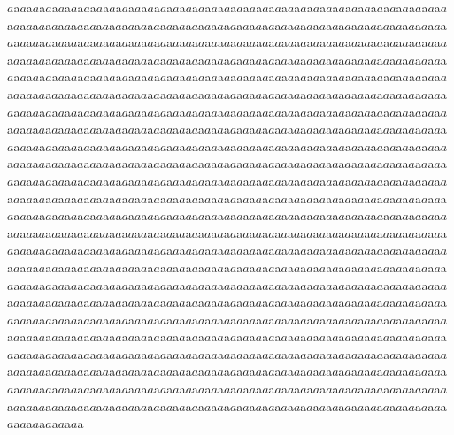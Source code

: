 \documentclass{article}
\begin{document}
$a$a$a$a$a$a$a$a$a$a$a$a$a$a$a$a$a$a$a$a$a$a$a$a$a$a$a$a$a$a$a$a$a$a$a$a$a$a$a$a$a$a$a$a$a$a$a$a$a$a$a$a$a$a$a$a$a$a$a$a$a$a$a$a$a$a$a$a$a$a$a$a$a$a$a$a$a$a$a$a$a$a$a$a$a$a$a$a$a$a$a$a$a$a$a$a$a$a$a$a$a$a$a$a$a$a$a$a$a$a$a$a$a$a$a$a$a$a$a$a$a$a$a$a$a$a$a$a$a$a$a$a$a$a$a$a$a$a$a$a$a$a$a$a$a$a$a$a$a$a$a$a$a$a$a$a$a$a$a$a$a$a$a$a$a$a$a$a$a$a$a$a$a$a$a$a$a$a$a$a$a$a$a$a$a$a$a$a$a$a$a$a$a$a$a$a$a$a$a$a$a$a$a$a$a$a$a$a$a$a$a$a$a$a$a$a$a$a$a$a$a$a$a$a$a$a$a$a$a$a$a$a$a$a$a$a$a$a$a$a$a$a$a$a$a$a$a$a$a$a$a$a$a$a$a$a$a$a$a$a$a$a$a$a$a$a$a$a$a$a$a$a$a$a$a$a$a$a$a$a$a$a$a$a$a$a$a$a$a$a$a$a$a$a$a$a$a$a$a$a$a$a$a$a$a$a$a$a$a$a$a$a$a$a$a$a$a$a$a$a$a$a$a$a$a$a$a$a$a$a$a$a$a$a$a$a$a$a$a$a$a$a$a$a$a$a$a$a$a$a$a$a$a$a$a$a$a$a$a$a$a$a$a$a$a$a$a$a$a$a$a$a$a$a$a$a$a$a$a$a$a$a$a$a$a$a$a$a$a$a$a$a$a$a$a$a$a$a$a$a$a$a$a$a$a$a$a$a$a$a$a$a$a$a$a$a$a$a$a$a$a$a$a$a$a$a$a$a$a$a$a$a$a$a$a$a$a$a$a$a$a$a$a$a$a$a$a$a$a$a$a$a$a$a$a$a$a$a$a$a$a$a$a$a$a$a$a$a$a$a$a$a$a$a$a$a$a$a$a$a$a$a$a$a$a$a$a$a$a$a$a$a$a$a$a$a$a$a$a$a$a$a$a$a$a$a$a$a$a$a$a$a$a$a$a$a$a$a$a$a$a$a$a$a$a$a$a$a$a$a$a$a$a$a$a$a$a$a$a$a$a$a$a$a$a$a$a$a$a$a$a$a$a$a$a$a$a$a$a$a$a$a$a$a$a$a$a$a$a$a$a$a$a$a$a$a$a$a$a$a$a$a$a$a$a$a$a$a$a$a$a$a$a$a$a$a$a$a$a$a$a$a$a$a$a$a$a$a$a$a$a$a$a$a$a$a$a$a$a$a$a$a$a$a$a$a$a$a$a$a$a$a$a$a$a$a$a$a$a$a$a$a$a$a$a$a$a$a$a$a$a$a$a$a$a$a$a$a$a$a$a$a$a$a$a$a$a$a$a$a$a$a$a$a$a$a$a$a$a$a$a$a$a$a$a$a$a$a$a$a$a$a$a$a$a$a$a$a$a$a$a$a$a$a$a$a$a$a$a$a$a$a$a$a$a$a$a$a$a$a$a$a$a$a$a$a$a$a$a$a$a$a$a$a$a$a$a$a$a$a$a$a$a$a$a$a$a$a$a$a$a$a$a$a$a$a$a$a$a$a$a$a$a$a$a$a$a$a$a$a$a$a$a$a$a$a$a$a$a$a$a$a$a$a$a$a$a$a$a$a$a$a$a$a$a$a$a$a$a$a$a$a$a$a$a$a$a$a$a$a$a$a$a$a$a$a$a$a$a$a$a$a$a$a$a$a$a$a$a$a$a$a$a$a$a$a$a$a$a$a$a$a$a$a$a$a$a$a$a$a$a$a$a$a$a$a$a$a$a$a$a$a$a$a$a$a$a$a$a$a$a$a$a$a$a$a$a$a$a$a$a$a$a$a$a$a$a$a$a$a$a$a$a$a$a$a$a$a$a$a$a$a$a$a$a$a$a$a$a$a$a$a$a$a$a$a$a$a$a$a$a$a$a$a$a$a$a$a$a$a$a$a$a$a$a$a$a$a$a$a$a$a$a$a$a$a$a$a$a$a$a$a$a$a$a$a$a$a$a$a$a$a$a$a$a$a$a$a$a$a$a$a$a$a$a$a$a$a$a$a$a$a$a$a$a$a$a$a$a$a$a$a$a$a$a$a$a$a$a$a$a$a$a$a$a$a$a$a$a$a$a$a$a$a$a$a$a$a$a$a$a$a$a$a$a$a$a$a$a$a$a$a$a$a$a$a$a$a$a$a$a$a$a$a$a$a$a$a$a$a$a$a$a$a$a$a$a$a$a$a$a$a$a$a$a$a$a$a$a$a$a$a$a$a$a$a$a$a$a$a$a$a$a$a$a$a$a$a$a$a$a$a$a$a$a$a$a$a$a$a$a$a$a$a$a$a$a$a$a$a$a$a$a$a$a$a$a$a$a$a$a$a$a$a$a$a$a$a$a$a$a$a$a$a$a$a$a$a$a$a$a$a$a$a$a$a$a$a$a$a$a$a$a$a$a$a$a$a$a$a$a$a$a$a$a$a$a$a$a$a$a$a$a$a$a$a$a$a$a$a$a$a$a$a$a$a$a$a$a$a$a$a$a$a$a$a$a$a$a$a$a$a$a$a$a$a$a$a$a$a$a$a$a$a$a$a$a$a$a$a$a$a$a$a$a$a$a$a$a$a$a$a$a$a$a$a$a$a$a$a$a$a$a$a$a$a$a$a$a$a$a$a$a$a$a$a$a$a$a$a$a$a$a$a$a$a$a$a$a$a$a$a$a$a$a$a$a$a$a$a$a$a$a$a$a$a$a$a$a$a$a$a$a$a$a$a$a$a$a$a$a$a$a$a$a$a$a$a$a$a$a$a$a$a$a$a$a$a$a$a$a$a$a$a$a$a$a$a$a$a$a$a$a$a$a$a$a$a$a$a$a$a$a$a$a$a$a$a$a$a$a$a$a$a$a$a$a$a$a$a$a$a$a$a$a$a$a$a$a$a$a$a$a$a$a$a$a$a$a$a$a$a$a$a$a$a$a$a$a$a$a$a$a$a$a$a$a$a$a$a$a$a$a$a$a$a$a$a$a$a$a$a$a$a$a$a$a$a$a$a$a$a$a$a$a$a$a$a$a$a$a$a$a$a$a$a$a$a$a$a$a$a$a$a$a$a$a$a$a$a$a$a$a$a$a$a$a$a$a$a$a$a$a$a$a$a$a$a$a$a$a$a$a$a$a$a$a$a$a$a$a$a$a$a$a$a$a$a$a$a$a$a$a$a$a$a$a$a$a$a$a$a$a$a$a$a$a$a$a$a$a$a$a$a$a$a$a$a$a$a$a$a$a$a$a$a$a$a$a$a$a$a$a$a$a$a$a$a$a$a$a$a$a$a$a$a$a$a$a$a$a$a$a$a$a$a$a$a$a$a$a$a$a$a$a$a$a$a$a$a$a$a$a$a$a$a$a$a$a$a$a$a$a$a$a$a$a$a$a$a$a$a$a$a$a$a$a$a$a$a$a$a$a$a$a$a$a$a$a$a$a$a$a$a$a$a$a$a$a$a$a$a$a$a$a$a$a$a$a$a$a$a$a$a$a$a$a$a$a$a$a$a$a$a$a$a$a$a$a$a$a$a$a$a$a$a$a$a$a$a$a$a$a$a$a$a$a$a
\end{document}
